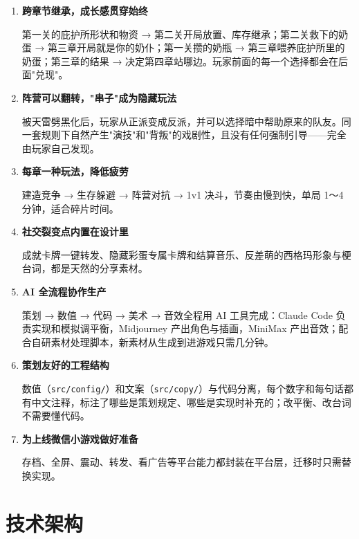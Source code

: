 \documentclass[11pt,a4paper]{ctexart}
\newcommand{\hl}[1]{\textbf{\color{milk}#1}}
\begin{document}
\begin{enumerate}[leftmargin=*]
  \item \hl{跨章节继承，成长感贯穿始终}\par
  第一关的庇护所形状和物资 → 第二关开局放置、库存继承；第二关救下的奶蛋 → 第三章开局就是你的奶仆；第一关攒的奶瓶 → 第三章喂养庇护所里的奶蛋；第三章的结果 → 决定第四章站哪边。玩家前面的每一个选择都会在后面"兑现"。

  \item \hl{阵营可以翻转，"串子"成为隐藏玩法}\par
  被天雷劈黑化后，玩家从正派变成反派，并可以选择暗中帮助原来的队友。同一套规则下自然产生"演技"和"背叛"的戏剧性，且没有任何强制引导——完全由玩家自己发现。

  \item \hl{每章一种玩法，降低疲劳}\par
  建造竞争 → 生存躲避 → 阵营对抗 → 1v1 决斗，节奏由慢到快，单局 1～4 分钟，适合碎片时间。

  \item \hl{社交裂变点内置在设计里}\par
  成就卡牌一键转发、隐藏彩蛋专属卡牌和结算音乐、反差萌的西格玛形象与梗台词，都是天然的分享素材。

  \item \hl{AI 全流程协作生产}\par
  策划 → 数值 → 代码 → 美术 → 音效全程用 AI 工具完成：Claude Code 负责实现和模拟调平衡，Midjourney 产出角色与插画，MiniMax 产出音效；配合自研素材处理脚本，新素材从生成到进游戏只需几分钟。

  \item \hl{策划友好的工程结构}\par
  数值（\texttt{src/config/}）和文案（\texttt{src/copy/}）与代码分离，每个数字和每句话都有中文注释，标注了哪些是策划规定、哪些是实现时补充的；改平衡、改台词不需要懂代码。

  \item \hl{为上线微信小游戏做好准备}\par
  存档、全屏、震动、转发、看广告等平台能力都封装在平台层，迁移时只需替换实现。
\end{enumerate}

\section{技术架构}
\end{document}
